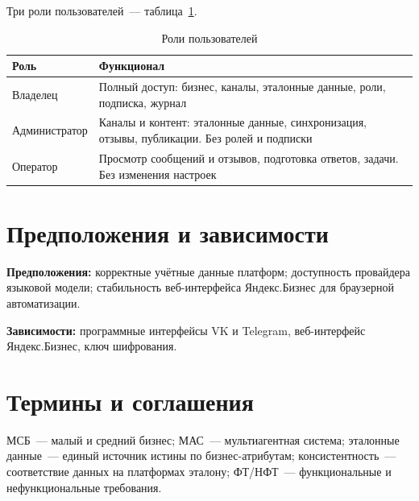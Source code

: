 Три роли пользователей~--- таблица~\ref{tab:roles}.

\begin{table}[H]
  \caption{Роли пользователей}
  \label{tab:roles}
  \small
  \begin{tabularx}{\textwidth}{|p{2.8cm}|X|}
    \hline
    \textbf{Роль} & \textbf{Функционал} \\
    \hline
    Владелец & Полный доступ: бизнес, каналы, эталонные данные, роли, подписка, журнал \\
    \hline
    Администратор & Каналы и контент: эталонные данные, синхронизация, отзывы, публикации. Без ролей и подписки \\
    \hline
    Оператор & Просмотр сообщений и отзывов, подготовка ответов, задачи. Без изменения настроек \\
    \hline
  \end{tabularx}
\end{table}

\section{Предположения и зависимости}
\label{sec:assumptions}

\textbf{Предположения:} корректные учётные данные платформ; доступность провайдера языковой модели; стабильность веб-интерфейса Яндекс.Бизнес для браузерной автоматизации.

\textbf{Зависимости:} программные интерфейсы VK и Telegram, веб-интерфейс Яндекс.Бизнес, ключ шифрования.

\section{Термины и соглашения}
\label{sec:terms}

МСБ~--- малый и средний бизнес; МАС~--- мультиагентная система; эталонные данные~--- единый источник истины по бизнес-атрибутам; консистентность~--- соответствие данных на платформах эталону; ФТ/НФТ~--- функциональные и нефункциональные требования.
